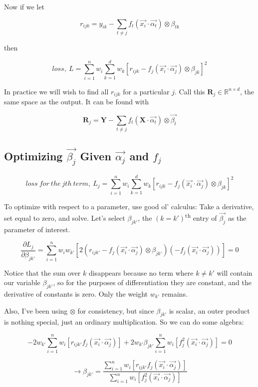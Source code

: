 \documentclass[12pt]{article}
\begin{document}
Now if we let

$$r_{ijk} = y_{ik} - \sum_{t \neq j} f_t(\vec{x_i} \cdot \vec{\alpha_t}) \otimes \beta_{tk}$$

then

$$loss,\ L = \sum_{i=1}^n w_i \sum_{k=1}^d w_k [r_{ijk} - f_j(\vec{x_i} \cdot \vec{\alpha_j}) \otimes \beta_{jk}]^2$$

In practice we will wish to find all $r_{ijk}$ for a particular $j$. Call this $\pmb{R}_j \in \mathbb{R}^{n \times d}$, the same space as the output. It can be found with

$$\pmb{R}_j = \pmb{Y} - \sum_{t \neq j} f_t(\pmb{X} \cdot \vec{\alpha_t}) \otimes \vec{\beta_t}$$

\subsection{Optimizing $\vec{\beta_j}$ Given $\vec{\alpha_j}$ and $f_j$}

$$loss\ for\ the\ jth\ term,\ L_j = \sum_{i=1}^n w_i \sum_{k=1}^d w_k [r_{ijk} - f_j(\vec{x_i} \cdot \vec{\alpha_j}) \otimes \beta_{jk}]^2$$

To optimize with respect to a parameter, use good ol' calculus: Take a derivative, set equal to zero, and solve. Let's select $\beta_{jk'}$, the $(k=k')$\textsuperscript{th} entry of $\vec{\beta_j}$ as the parameter of interest.

$$\frac{\partial L_j}{\partial \beta_{jk'}} = \sum_{i=1}^n w_i w_{k'} [2(r_{ijk'} - f_j(\vec{x_i} \cdot \vec{\alpha_j}) \otimes \beta_{jk'})(-f_j(\vec{x_i} \cdot \vec{\alpha_j}))] = 0$$

Notice that the sum over $k$ disappears because no term where $k \neq k'$ will contain our variable $\beta_{jk'}$, so for the purposes of differentiation they are constant, and the derivative of constants is zero. Only the weight $w_{k'}$ remains.

Also, I've been using $\otimes$ for consistency, but since $\beta_{jk'}$ is scalar, an outer product is nothing special, just an ordinary multiplication. So we can do some algebra:

$$ -2 w_{k'} \sum_{i=1}^n w_i [r_{ijk'} f_j(\vec{x_i} \cdot \vec{\alpha_j})] + 2 w_{k'} \beta_{jk'} \sum_{i=1}^n w_i [f_j^2(\vec{x_i} \cdot \vec{\alpha_j})] = 0 $$

$$\rightarrow \beta_{jk'} = \frac{\sum_{i=1}^n w_i [r_{ijk'} f_j(\vec{x_i} \cdot \vec{\alpha_j})]}{\sum_{i=1}^n w_i [f_j^2(\vec{x_i} \cdot \vec{\alpha_j})]}$$
\end{document}

